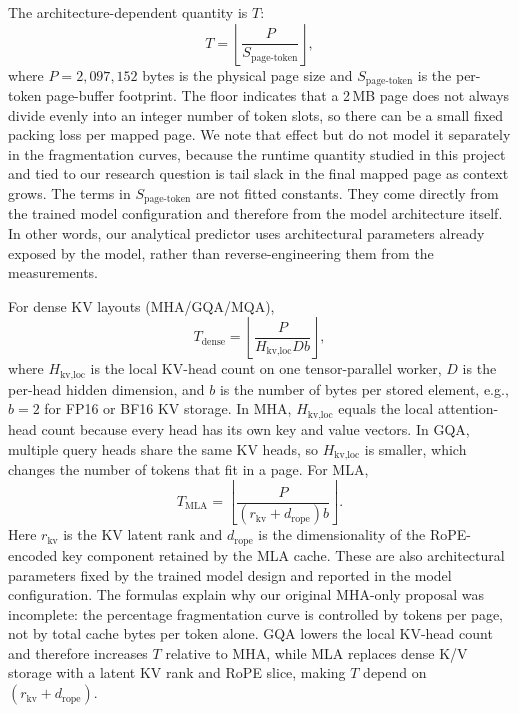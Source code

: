\documentclass[conference]{IEEEtran}
\begin{document}
The architecture-dependent quantity is $T$:
\begin{equation}
T=\left\lfloor\frac{P}{S_{\text{page-token}}}\right\rfloor,
\end{equation}
where $P=2{,}097{,}152$ bytes is the physical page 
size and $S_{\text{page-token}}$ is the per-token page-buffer footprint.
The floor indicates that a 2\,MB page does not always divide evenly into
an integer number of token slots, so there can be a small fixed packing
loss per mapped page. We note that effect but do not model it separately
in the fragmentation curves, because the runtime quantity studied in this
project and tied to our research question is tail slack in the final mapped
page as context grows.
The terms in $S_{\text{page-token}}$ are not fitted constants. They come
directly from the trained model configuration and therefore from the model
architecture itself. In other words, our analytical predictor uses
architectural parameters already exposed by the model, rather than
reverse-engineering them from the measurements.

For dense KV layouts (MHA/GQA/MQA),
\begin{equation}
T_{\text{dense}}=\left\lfloor\frac{P}{H_{\text{kv,loc}}Db}\right\rfloor,
\end{equation}
where $H_{\text{kv,loc}}$ is the local KV-head count on one tensor-parallel
worker, $D$ is the per-head hidden dimension, and $b$ is the number of bytes
per stored element, e.g., $b=2$ for FP16 or BF16 KV storage. In MHA,
$H_{\text{kv,loc}}$ equals the local attention-head count because every head
has its own key and value vectors. In GQA, multiple query heads share the
same KV heads, so $H_{\text{kv,loc}}$ is smaller, which changes the number of
tokens that fit in a page. For MLA,
\begin{equation}
T_{\text{MLA}}=\left\lfloor\frac{P}{(r_{\text{kv}}+d_{\text{rope}})b}\right\rfloor.
\end{equation}
Here $r_{\text{kv}}$ is the KV latent rank and $d_{\text{rope}}$ is the
dimensionality of the RoPE-encoded key component retained by the MLA cache.
These are also architectural parameters fixed by the trained model design and
reported in the model configuration.
The formulas explain why our original MHA-only proposal was incomplete: the percentage fragmentation curve is controlled by tokens per page, not by total cache bytes per token alone. GQA lowers the local KV-head count and therefore increases $T$ relative to MHA, while MLA replaces dense K/V storage with a latent KV rank and RoPE slice, making $T$ depend on $(r_{\text{kv}}+d_{\text{rope}})$.
\end{document}
